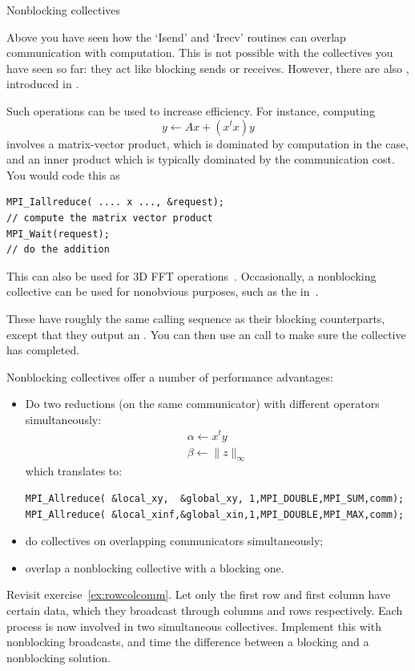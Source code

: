  {Nonblocking collectives}
\label{sec:mpi3collect}

Above you have seen how the `Isend' and `Irecv' routines can overlap communication
with computation. This is not possible with the collectives you have seen so far:
they act like blocking sends or receives.
However, there are also ,
introduced in .

Such operations can be used to increase efficiency.
For instance, computing
\[ y \leftarrow Ax + (x^tx)y \]
involves a matrix-vector product, which is dominated by computation
in the  case, and an inner product which is 
typically dominated by the communication cost. You would code this as
\begin{lstlisting}
MPI_Iallreduce( .... x ..., &request);
// compute the matrix vector product
MPI_Wait(request);
// do the addition
\end{lstlisting}

This can also be used for 3D FFT operations~\cite{Hoefler:case-for-nbc}.
Occasionally, a nonblocking collective can be used for nonobvious purposes,
such as the  in~\cite{Hoefler:2010:SCP}.

These have roughly the same calling sequence as their blocking counterparts,
except that they output an . You
can then use an  call to make sure the collective
has completed.

Nonblocking collectives offer a number of performance advantages:
\begin{itemize}
\item Do two reductions (on the same communicator) with different
  operators simultaneously:
\[ 
\begin{array}{l}
  \alpha\leftarrow x^ty\\
  \beta\leftarrow \|z\|_\infty
\end{array}
\]
which translates to:
\begin{lstlisting}
MPI_Allreduce( &local_xy,  &global_xy, 1,MPI_DOUBLE,MPI_SUM,comm);
MPI_Allreduce( &local_xinf,&global_xin,1,MPI_DOUBLE,MPI_MAX,comm);
\end{lstlisting}
\item do collectives on overlapping communicators simultaneously;
\item overlap a nonblocking collective with a blocking one.
\end{itemize}

\begin{exercise}
  \label{ex:procgridnonblock}
  Revisit exercise~\ref{ex:rowcolcomm}. Let only the first row and
  first column have certain data, which they broadcast through columns
  and rows respectively. Each process is now involved in two
  simultaneous collectives. Implement this with nonblocking
  broadcasts, and time the difference between a blocking and a
  nonblocking solution.
\end{exercise}

